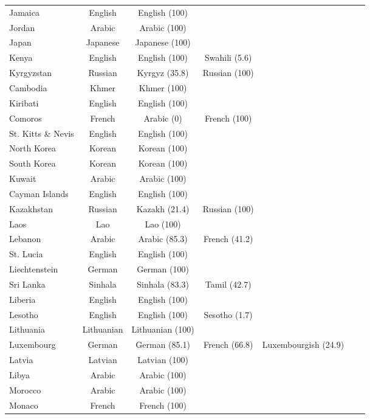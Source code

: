 \begin{longtable}{lc | c | c | c | c | c}
 Jamaica & English & English (100) &   &   &   &   \\ 
 Jordan & Arabic & Arabic (100) &   &   &   &   \\ 
 Japan & Japanese & Japanese (100) &   &   &   &   \\ 
 Kenya & English & English (100) & Swahili (5.6) &   &   &   \\ 
 Kyrgyzstan & Russian & Kyrgyz (35.8) & Russian (100) &   &   &   \\ 
 Cambodia & Khmer & Khmer (100) &   &   &   &   \\ 
 Kiribati & English & English (100) &   &   &   &   \\ 
 Comoros & French & Arabic (0) & French (100) &   &   &   \\ 
 St. Kitts \& Nevis & English & English (100) &   &   &   &   \\ 
 North Korea & Korean & Korean (100) &   &   &   &   \\ 
 South Korea & Korean & Korean (100) &   &   &   &   \\ 
 Kuwait & Arabic & Arabic (100) &   &   &   &   \\ 
 Cayman Islands & English & English (100) &   &   &   &   \\ 
 Kazakhstan & Russian & Kazakh (21.4) & Russian (100) &   &   &   \\ 
 Laos & Lao & Lao (100) &   &   &   &   \\ 
 Lebanon & Arabic & Arabic (85.3) & French (41.2) &   &   &   \\ 
 St. Lucia & English & English (100) &   &   &   &   \\ 
 Liechtenstein & German & German (100) &   &   &   &   \\ 
 Sri Lanka & Sinhala & Sinhala (83.3) & Tamil (42.7) &   &   &   \\ 
 Liberia & English & English (100) &   &   &   &   \\ 
 Lesotho & English & English (100) & Sesotho (1.7) &   &   &   \\ 
 Lithuania & Lithuanian & Lithuanian (100) &   &   &   &   \\ 
 Luxembourg & German & German (85.1) & French (66.8) & Luxembourgish (24.9) &   &   \\ 
 Latvia & Latvian & Latvian (100) &   &   &   &   \\ 
 Libya & Arabic & Arabic (100) &   &   &   &   \\ 
 Morocco & Arabic & Arabic (100) &   &   &   &   \\ 
 Monaco & French & French (100) &   &   &   &   \\ 

\end{longtable}
